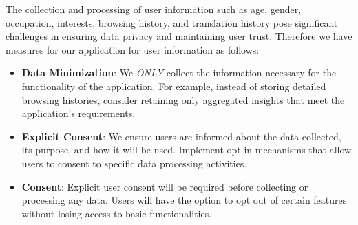 \documentclass{article}
\begin{document}
The collection and processing of user information such as age, gender, occupation, interests, browsing history, and translation history pose significant challenges in ensuring data privacy and maintaining user trust. Therefore we have measures for our application for user information as follows:

\begin{itemize}
    \item \textbf{Data Minimization}: We \textit{ONLY} collect the information necessary for the functionality of the application. For example, instead of storing detailed browsing histories, consider retaining only aggregated insights that meet the application's requirements.
    \item \textbf{Explicit Consent}: We ensure users are informed about the data collected, its purpose, and how it will be used. Implement opt-in mechanisms that allow users to consent to specific data processing activities.
    \item \textbf{Consent}: Explicit user consent will be required before collecting or processing any data. Users will have the option to opt out of certain features without losing access to basic functionalities.
\end{itemize}
\end{document}
